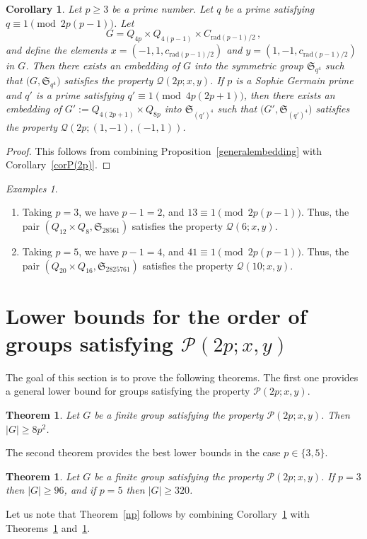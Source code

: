 \documentclass[12pt]{amsart}
\numberwithin{equation}{section}
\newtheorem{cor}[X]{Corollary}
\newtheorem{thm}[X]{Theorem}
\theoremstyle{definition}
\theoremstyle{remark}
\newtheorem*{examples}{Examples}
\begin{document}
\begin{cor}\label{smallerembedding}
    Let $p\ge 3$ be a prime number. Let $q$ be a prime satisfying $q\equiv 1 \pmod{2p(p-1)}$. Let \[G=Q_{4p}\times Q_{4(p-1)}\times C_{\mathrm{rad}(p-1)/2}\, ,\] and define the elements $x=(-1, 1,c_{\mathrm{rad}(p-1)/2})$ and $y=(1, -1,c_{\mathrm{rad}(p-1)/2})$ in $G$. Then there exists an embedding of $G$ into the symmetric group $\mathfrak{S}_{q^4}$ such that $\bigl(G,\mathfrak{S}_{q^4}\bigr)$ satisfies the property $\mathcal{Q}(2p;x,y)$. If $p$ is a Sophie Germain prime and $q'$ is a prime satisfying $q'\equiv 1 \pmod{4p(2p+1)}$, then there exists an embedding of $G':=Q_{4(2p+1)}\times Q_{8p}$ into $\mathfrak{S}_{(q')^4}$ such that $\bigl(G',\mathfrak{S}_{(q')^4}\bigr)$ satisfies the property $\mathcal{Q}(2p;(1,-1),(-1,1))$.
\end{cor}

\begin{proof}
    This follows from combining Proposition~\ref{generalembedding} with Corollary~\ref{corP(2p)}.
\end{proof}

\begin{examples}
    \begin{enumerate}
        \item Taking $p=3$, we have $p-1=2$, and $13\equiv 1\pmod{2p(p-1)}$. Thus, the pair $(Q_{12}\times Q_8,\mathfrak{S}_{28561})$ satisfies the property $\mathcal{Q}(6;x,y)$.
        \item Taking $p=5$, we have $p-1=4$, and $41\equiv 1 \pmod{2p(p-1)}$. Thus, the pair $(Q_{20}\times Q_{16},\mathfrak{S}_{2825761})$ satisfies the property $\mathcal{Q}(10;x,y)$.
    \end{enumerate}
\end{examples}















\section{Lower bounds for the order of groups satisfying $\mathcal{P}(2p;x,y)$}\label{lbounds}
The goal of this section is to prove the following theorems. The first one provides a general lower bound for groups satisfying the property $\mathcal{P}(2p;x,y)$. 
\begin{thm}\label{lowerbound}
    Let $G$ be a finite group satisfying the property $\mathcal{P}(2p;x,y)$. Then $|G|\ge 8p^2$. 
\end{thm}
The second theorem provides the best lower bounds in the case $p\in \{3,5\}$.
\begin{thm}\label{n3andn5}
    Let $G$ be a finite group satisfying the property $\mathcal{P}(2p;x,y)$. If $p=3$ then $|G|\ge 96$, and if $p=5$ then $|G|\ge 320$.
\end{thm}
Let us note that Theorem~\ref{np} follows by combining Corollary~\ref{smallerembedding} with Theorems~\ref{lowerbound} and~\ref{n3andn5}. 
\end{document}

